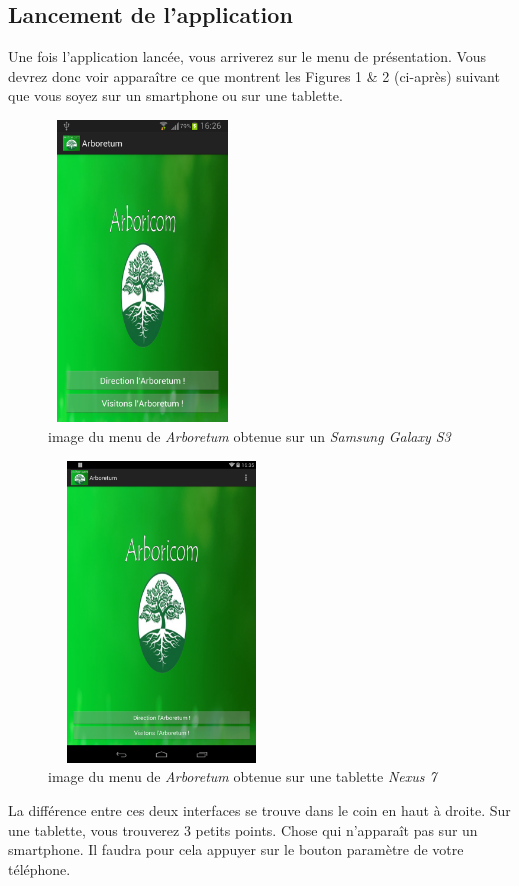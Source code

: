 \documentclass[a4paper,11pt]{article}
\begin{document}
    \subsection{Lancement de l'application}
    Une fois l'application lancée, vous arriverez sur le menu de présentation. Vous devrez donc voir apparaître ce que montrent les Figures 1 \& 2 (ci-après)
    suivant que vous soyez sur un smartphone ou sur une tablette.
    \begin{figure}[H]
     \begin{center}
      \includegraphics[width=5cm,height=8cm]{menu.png}
      \caption{image du menu de \textit{Arboretum} obtenue sur un \textit{Samsung Galaxy S3}}
     \end{center}
    \end{figure}
    \begin{figure}[H]
     \begin{center}
      \includegraphics[width=6cm,height=8cm]{menuTablette.png}
      \caption{image du menu de \textit{Arboretum} obtenue sur une tablette \textit{Nexus 7}}
     \end{center}
    \end{figure}
    La différence entre ces deux interfaces se trouve dans le coin en haut à droite. Sur une tablette, vous trouverez 3 petits points. Chose qui
    n'apparaît pas sur un smartphone. Il faudra pour cela appuyer sur le bouton paramètre de votre téléphone.
    
\end{document}
